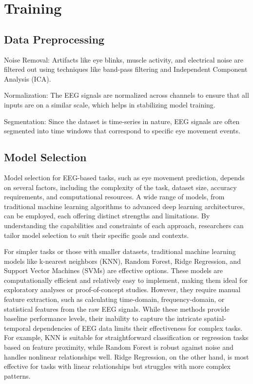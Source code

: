 \documentclass{article}
\begin{document}
\section {Training}

\subsection {Data Preprocessing}


Noise Removal: Artifacts like eye blinks, muscle activity, and electrical noise are filtered out using techniques like band-pass filtering and Independent Component Analysis (ICA).


Normalization: The EEG signals are normalized across channels to ensure that all inputs are on a similar scale, which helps in stabilizing model training.


Segmentation: Since the dataset is time-series in nature, EEG signals are often segmented into time windows that correspond to specific eye movement events.

\subsection {Model Selection}

Model selection for EEG-based tasks, such as eye movement prediction, depends on several factors, including the complexity of the task, dataset size, accuracy requirements, and computational resources. A wide range of models, from traditional machine learning algorithms to advanced deep learning architectures, can be employed, each offering distinct strengths and limitations. By understanding the capabilities and constraints of each approach, researchers can tailor model selection to suit their specific goals and contexts.

For simpler tasks or those with smaller datasets, traditional machine learning models like k-nearest neighbors (KNN), Random Forest, Ridge Regression, and Support Vector Machines (SVMs) are effective options. These models are computationally efficient and relatively easy to implement, making them ideal for exploratory analyses or proof-of-concept studies. However, they require manual feature extraction, such as calculating time-domain, frequency-domain, or statistical features from the raw EEG signals. While these methods provide baseline performance levels, their inability to capture the intricate spatial-temporal dependencies of EEG data limits their effectiveness for complex tasks. For example, KNN is suitable for straightforward classification or regression tasks based on feature proximity, while Random Forest is robust against noise and handles nonlinear relationships well. Ridge Regression, on the other hand, is most effective for tasks with linear relationships but struggles with more complex patterns.
\end{document}

